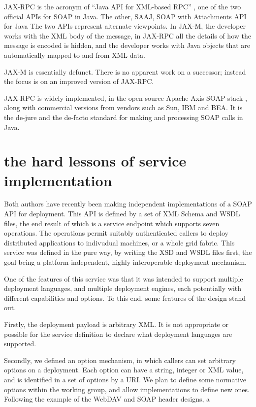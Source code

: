 \documentclass[draft]{article}
\begin{document}
JAX-RPC is the acronym of ``Java API for XML-based RPC'' \cite{spec:JAX-RPC-11}, 
one of the two official APIs for SOAP in Java. 
The other, SAAJ, SOAP with Attachments API for Java \cite{spec:SAAJ-11}
The two APIs represent alternate viewpoints. In JAX-M, the developer works with the
XML body of the message, in JAX-RPC all the details of how the message is encoded
is hidden, and the developer works with Java objects that are automatically mapped
to and from XML data. 

JAX-M is essentially defunct. There is no apparent work on a successor;
instead the focus is on an improved version of JAX-RPC. 

JAX-RPC is widely implemented, in the open source Apache Axis SOAP stack \cite{axis},
along with commercial versions from vendors such as Sun, IBM and BEA. It is the de-jure
and the de-facto standard for making and processing SOAP calls in Java. 


\section{the hard lessons of service implementation}

Both authors have recently been making independent implementations of a SOAP API
for deployment. This API is defined by a set of XML Schema and WSDL files, the
end result of which is a service endpoint which supports seven operations. The 
operations permit suitably authenticated callers to deploy distributed applications
to indivudual machines, or a whole grid fabric. This service was defined in the pure way, 
by writing the XSD and WSDL files first, the goal being a platform-independent, highly
interoperable deployment mechanism. 

One of the features of this service was that it was intended to support 
multiple deployment languages, and multiple deployment engines, each potentially
with different capabilities and options. To this end, some features of the design
stand out. 

Firstly, the deployment payload is arbitrary XML. It is not appropriate 
or possible for the service definition to declare what deployment languages are 
supported. 

Secondly, we defined an option mechanism, in which callers can set
arbitrary options on a deployment. Each option can have a string, integer or XML value,
and is identified in a set of options by a URI. We plan to define some normative options
within the working group, and allow implementations to define new ones. 
Following the example of the WebDAV and SOAP header designs, a 
\end{document}
